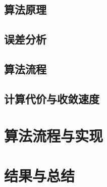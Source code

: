 \documentclass[UTF8]{ctexart}
\begin{document}
\subsection{算法原理}

\subsection{误差分析}

\subsection{算法流程}

\subsection{计算代价与收敛速度}

\section{算法流程与实现}

\section{结果与总结}
\end{document}
